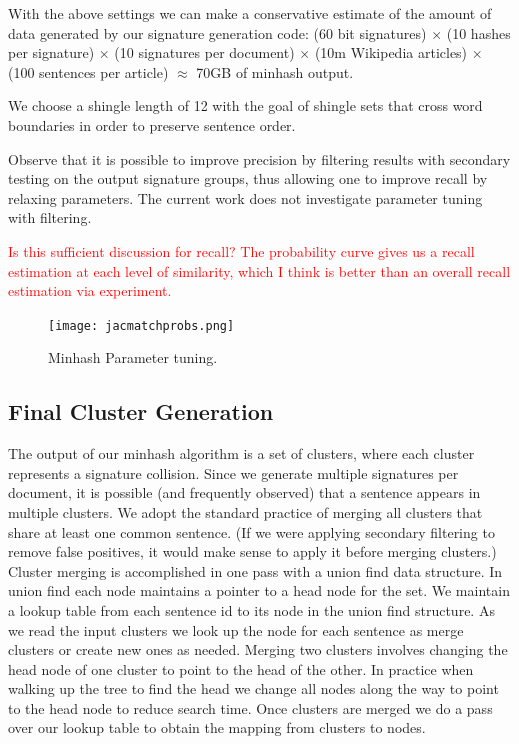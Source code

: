 \documentclass[letterpaper]{article}
\newcommand{\red}[1]{\textcolor{red}{#1}}
\begin{document}
With the above settings we can make a conservative estimate of the
amount of data generated by our signature generation code: (60 bit
signatures) $\times$ (10 hashes per signature) $\times$ (10 signatures
per document) $\times$ (10m Wikipedia articles) $\times$ (100
sentences per article) $\approx$ 70GB of minhash output.

We choose a shingle length of 12 with the goal of shingle sets that
cross word boundaries in order to preserve sentence order.

Observe that it is possible to improve precision by filtering results
with secondary testing on the output signature groups, thus allowing
one to improve recall by relaxing parameters. The current work does
not investigate parameter tuning with filtering.

\red{Is this sufficient discussion for recall? The probability curve gives us a recall estimation at each level of similarity, which I think is better than an overall recall estimation via experiment.}

\begin{figure}
\centering
\texttt{[image: jacmatchprobs.png]}
\caption{Minhash Parameter tuning.}
\label{clust}
\end{figure}

\subsection{Final Cluster Generation}

The output of our minhash algorithm is a set of clusters, where each
cluster represents a signature collision. Since we generate multiple
signatures per document, it is possible (and frequently observed) that
a sentence appears in multiple clusters. We adopt the standard
practice of merging all clusters that share at least one common
sentence. (If we were applying secondary filtering to remove false
positives, it would make sense to apply it before merging clusters.)
Cluster merging is accomplished in one pass with a union find data
structure. In union find each node maintains a pointer to a head node
for the set. We maintain a lookup table from each sentence id to its
node in the union find structure. As we read the input clusters we
look up the node for each sentence as merge clusters or create new
ones as needed. Merging two clusters involves changing the head node
of one cluster to point to the head of the other. In practice when
walking up the tree to find the head we change all nodes along the way
to point to the head node to reduce search time. Once clusters are
merged we do a pass over our lookup table to obtain the mapping from
clusters to nodes.
\end{document}
